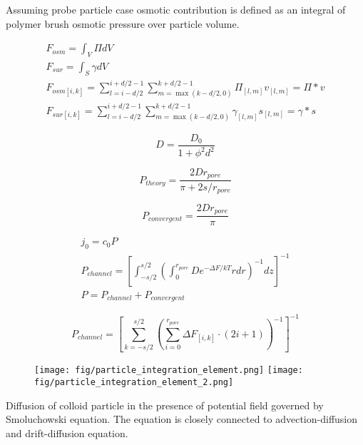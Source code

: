\documentclass[12pt, a4paper]{article}
\begin{document}
Assuming probe particle case osmotic contribution is defined as an integral of polymer brush osmotic pressure over particle volume.

\begin{eqnarray}
    F_{osm} = \int_V \Pi dV
    \\
    F_{sur} = \int_S \gamma dV
    \\
    F_{osm [i, k]} = \sum_{l=i-d/2}^{i+d/2-1} \sum_{m=\max(k-d/2, 0)}^{k+d/2-1} \Pi_{[l,m]} v_{[l, m]} = \Pi \ast v
    \\
    F_{sur [i, k]} = \sum_{l=i-d/2}^{i+d/2-1} \sum_{m=\max(k-d/2, 0)}^{k+d/2-1} \gamma_{[l,m]} s_{[l, m]} = \gamma \ast s
\end{eqnarray}

\begin{equation}
    D = \frac{D_{0}}{1+\phi^2 d^2}
\end{equation}

\begin{equation}
    P_{theory} = \frac{2 D r_{pore}}{\pi + 2 s / r_{pore}}
\end{equation}

\begin{equation}
    P_{convergent} = \frac{2 D r_{pore}}{\pi}
\end{equation}

\begin{eqnarray}
    j_0 = c_0 P
    \\
    P_{channel} = \left[\int_{-s/2}^{s/2} \left( \int_{0}^{r_{pore}} D e^{-\Delta F / kT} r dr \right)^{-1} dz \right]^{-1}
    \\
    P = P_{channel}  + P_{convergent}
\end{eqnarray}


\begin{equation}
    P_{channel} = \left[\sum_{k=-s/2}^{s/2} \left( \sum_{i=0}^{r_{pore}} \Delta F_{[i,k]} \cdot (2i+1) \right)^{-1} \right]^{-1}
\end{equation}


\begin{figure}
    \texttt{[image: fig/particle\_integration\_element.png]}
    \texttt{[image: fig/particle\_integration\_element\_2.png]}
\end{figure}




Diffusion of colloid particle in the presence of potential field governed by Smoluchowski equation. The equation is closely connected to advection-diffusion and drift-diffusion equation.
\end{document}
